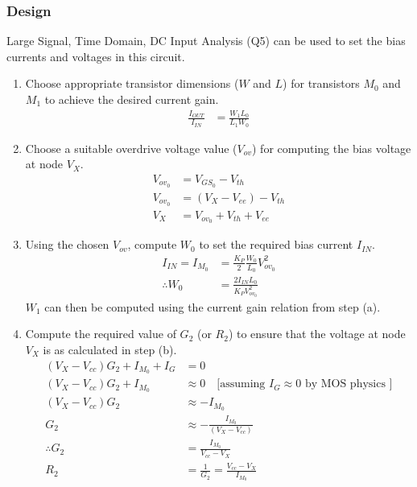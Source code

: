 \subsubsection{Design}
Large Signal, Time Domain, DC Input Analysis (Q5) can be used to set the bias
currents and voltages in this circuit.
\begin{enumerate}
  \item Choose appropriate transistor dimensions
    ($W$ and $L$) for transistors $M_0$ and $M_1$
    to achieve the desired current gain.
    \begin{align*}
      \frac{I_{OUT}}{I_{IN}} &= \frac{W_1 L_0}{L_1 W_0}
    \end{align*}
  \item Choose a suitable overdrive voltage value
    ($V_{ov}$) for computing the bias voltage at
    node $V_{X}$.
    \begin{align*}
      V_{ov_0} &= V_{GS_0} - V_{th} \\
      V_{ov_0} &= (V_{X} - V_{ee}) - V_{th} \\
      V_{X} &= V_{ov_0} + V_{th} + V_{ee}
    \end{align*}
  \item Using the chosen $V_{ov}$, compute $W_0$
    to set the required bias current $I_{IN}$.
    \begin{align*}
      I_{IN} = I_{M_0} &= \frac{K_P}{2} \frac{W_0}{L_0} V_{ov_0}^2 \\
      \therefore W_0 &= \frac{2 I_{IN} L_0}{K_P V_{ov_0}^2}
    \end{align*}
    $W_1$ can then be computed using the current
    gain relation from step (a).
  \item Compute the required value of $G_2$ (or
    $R_2$) to ensure that the voltage at node
    $V_{X}$ is as calculated in step (b).
    \begin{align*}
      (V_{X} - V_{cc})G_2 + I_{M_0} + I_{G} &= 0 \\
      (V_{X} - V_{cc})G_2 + I_{M_0} &\approx 0 \quad \text{[assuming } I_G \approx 0 \text{ by MOS physics ]} \\
      (V_{X} - V_{cc})G_2 &\approx - I_{M_0} \\
      G_2 &\approx - \frac{I_{M_0}}{(V_{X} - V_{cc})} \\
      \therefore G_2 &= \frac{I_{M_0}}{V_{cc} - V_{X}} \\
      R_2 &= \frac{1}{G_2} = \frac{V_{cc} - V_{X}}{I_{M_0}}
    \end{align*}
\end{enumerate}

